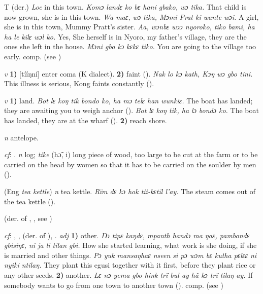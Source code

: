 \begin{letter}{T}
 (der.) \textit{Loc} in this town. \textit{Komɔ landɛ ko bɛ hani gbako, wɔ tika.} That child is now grown, she is in this town. \textit{Wa maɛ, wɔ tika, Mɔmi Prat ki wante wɔi.} A girl, she is in this town, Mummy Pratt's sister. \textit{Aa, wɔnbɛ wɔɔ nyoroko, tiko bami, ha ha le kilɛ wɔl ko.} Yes, She herself is in Nyoro, my father's village, they are the ones she left in the house. \textit{Mɔni gbo kɔ kɛkɛ tiko.} You are going to the village too early. comp.  (see ) 

 \textit{v} \textbf{1)} [tííŋní] enter coma (K dialect). \textbf{2)} faint (\citealt{Pichl1967}). \textit{Nak lo kɔ kath, Kɔŋ wɔ gbo tini.} This illness is serious, Kong faints constantly (\citealt{Pichl1967}). 

 \textit{v} \textbf{1)} land. \textit{Bot lɛ koŋ tik bondo ko, ha mɔ telɛ han wunkiɛ.} The boat has landed; they are awaiting you to weigh anchor (\citealt{Pichl1967}). \textit{Bot lɛ koŋ tik, ha lɔ bondɔ ko.} The boat has landed, they are at the wharf (\citealt{Pichl1967}). \textbf{2)} reach shore. 

 \textit{n} antelope.

 \textit{cf}: . \textit{n} log; \textit{tike} (hɔ̃, i) long piece of wood, too large to be cut at the farm or to be carried on the head by women so that it has to be carried on the soulder by men (\citealt{Pichl1967}).

 (Eng \textit{tea kettle}) \textit{n} tea kettle. \textit{Rïm dɛ kɔ hok tii-kɛtïl l'ay.} The steam comes out of the tea kettle (\citealt{Pichl1967}).

 (der. of , , see )

 \textit{cf}: , ,  (der. of ), . \textit{adj} \textbf{1)} other. \textit{Ŋɔ tipɛ kaŋdɛ, mpanth handɔ ma ŋaɛ, pambondɛ gbisiŋɛ, ni ja li tilan gbi.} How she started learning, what work is she doing, if she is married and other things. \textit{Pɔ yuk mansaŋhaɛ nseen si pɔ wɔm bɛ kutha pɛlɛɛ ni nyiki ntilaŋ.} They plant this egusi together with it first, before they plant rice or any other seeds. \textbf{2)} another. \textit{Lɛ nɔ yema gbo hink trï bul ay hã kɔ trï tilaŋ ay.} If somebody wants to go from one town to another town (\citealt{Pichl1967}). comp.  (see ) 


\end{letter}
